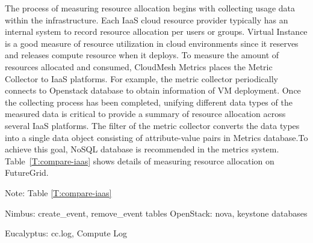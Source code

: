 \documentclass{tex/sig-alternate}
\begin{document}
{The process of measuring resource allocation begins with collecting usage data within the infrastructure. Each IaaS cloud resource provider typically has an internal system to record resource allocation per users or groups. Virtual Instance is a good measure of resource utilization in cloud environments since it reserves and releases compute resource when it deploys. To measure the amount of resources allocated and consumed, CloudMesh Metrics places the Metric Collector to IaaS platforms. For example, the metric collector periodically connects to Openstack database to obtain information of VM deployment. Once the collecting process has been completed, unifying different data types of the measured data is critical to provide a summary of resource allocation across several IaaS platforms. The filter of the metric collector converts the data types into a single data object consisting of attribute-value pairs in Metrics database.To achieve this goal, NoSQL database is recommended in the metrics system.  Table~\ref{T:compare-iaas} shows  details of measuring resource allocation on FutureGrid.

Note:
Table \ref{T:compare-iaas}

    Nimbus: create\_event, remove\_event tables 
    OpenStack: nova, keystone  databases 

    Eucalyptus: cc.log, Compute Log 


\newcommand{\YES}{\ding{51}}

\newcommand{\NO}{\ding{55}}


}
\end{document}
